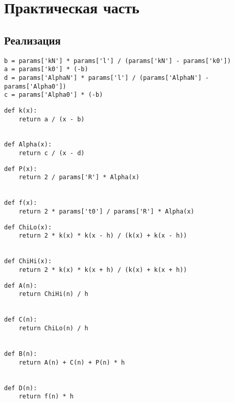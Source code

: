 \chapter{Практическая часть}

\section{Реализация}
\lstset{language=python}

\begin{lstlisting}[caption={Параметры коэффициентов теплопроводности материала стержня и теплоотдачи при обдуве},label={lst:1}]
b = params['kN'] * params['l'] / (params['kN'] - params['k0'])
a = params['k0'] * (-b)
d = params['AlphaN'] * params['l'] / (params['AlphaN'] - params['Alpha0'])
c = params['Alpha0'] * (-b)
\end{lstlisting}
\begin{lstlisting}[caption={Коэффициенты теплопроводности материала стержня и теплоотдачи при обдуве},label={lst:2}]
def k(x):
    return a / (x - b)


def Alpha(x):
    return c / (x - d)
\end{lstlisting}
\begin{lstlisting}[caption={$p(x)$ и $f(x)$},label={lst:}]
def P(x):
    return 2 / params['R'] * Alpha(x)


def f(x):
    return 2 * params['t0'] / params['R'] * Alpha(x)
\end{lstlisting}
\begin{lstlisting}[caption={Метод средних для $\chi$},label={lst:}]
def ChiLo(x):
    return 2 * k(x) * k(x - h) / (k(x) + k(x - h))


def ChiHi(x):
    return 2 * k(x) * k(x + h) / (k(x) + k(x + h))
\end{lstlisting}
\begin{lstlisting}[caption={Параметры разностной схемы},label={lst:}]
def A(n):
    return ChiHi(n) / h


def C(n):
    return ChiLo(n) / h


def B(n):
    return A(n) + C(n) + P(n) * h


def D(n):
    return f(n) * h
\end{lstlisting}
